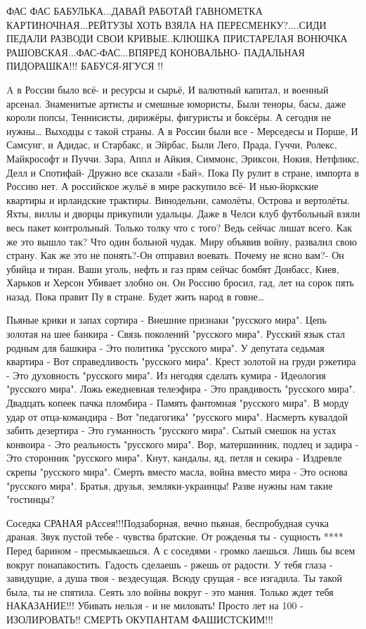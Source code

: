 ФАС ФАС БАБУЛЬКА...ДАВАЙ РАБОТАЙ ГАВНОМЕТКА КАРТИНОЧНАЯ...РЕЙТУЗЫ ХОТЬ ВЗЯЛА НА
ПЕРЕСМЕНКУ?....СИДИ ПЕДАЛИ РАЗВОДИ СВОИ КРИВЫЕ..КЛЮШКА ПРИСТАРЕЛАЯ ВОНЮЧКА
РАШОВСКАЯ...ФАС-ФАС...ВПЯРЕД КОНОВАЛЬНО- ПАДАЛЬНАЯ ПИДОРАШКА!!! БАБУСЯ-ЯГУСЯ !!      


A в России было всё- и ресурсы и сырьё,
И валютный капитал, и военный арсенал.
Знаменитые артисты и смешные юмористы,
Были теноры, басы, даже короли попсы,
Теннисисты, дирижёры, фигуристы и боксёры.
А сегодня не нужны… Выходцы с такой страны.
А в России были все - Мерседесы и Порше,
И Самсунг, и Адидас, и Старбакс, и Эйрбас,
Были Лего, Прада, Гуччи, Ролекс, Майкрософт и Пуччи.
Зара, Аппл и Айкия, Симмонс, Эриксон, Нокия,
Нетфликс, Делл и Спотифай-
Дружно все сказали «Бай».
Пока Пу рулит в стране, импорта в Россию нет.
А российское жульё в мире раскупило всё-
И нью-йоркские квартиры и ирландские трактиры.
Винодельни, самолёты,
Острова и вертолёты.
Яхты, виллы и дворцы прикупили удальцы.
Даже в Челси клуб футбольный
взяли весь пакет контрольный.
Только толку что с того?
Ведь сейчас лишат всего.
Как же это вышло так? Что один больной чудак.
Миру объявив войну, развалил свою страну.
Как же это не понять?-Он отправил воевать.
Почему не ясно вам?- Он убийца и тиран.
Ваши уголь, нефть и газ прям сейчас бомбят Донбасс,
Киев, Харьков и Херсон
Убивает злобно он.
Он Россию бросил, гад, лет на сорок пять назад.
Пока правит Пу в стране.
Будет жить народ в говне…

Пьяные крики и запах сортира -
Внешние признаки "русского мира".
Цепь золотая на шее банкира -
Связь поколений "русского мира".
Русский язык стал родным для башкира -
Это политика "русского мира".
У депутата седьмая квартира -
Вот справедливость "русского мира".
Крест золотой на груди рэкетира -
Это духовность "русского мира".
Из негодяя сделать кумира -
Идеология "русского мира".
Ложь ежедневная телеэфира -
Это правдивость "русского мира".
Двадцать копеек пачка пломбира -
Память фантомная "русского мира".
В морду удар от отца-командира -
Вот "педагогика" "русского мира".
Насмерть кувалдой забить дезертира -
Это гуманность "русского мира".
Сытый смешок на устах конвоира -
Это реальность "русского мира".
Вор, матершинник, подлец и задира -
Это сторонник "русского мира".
Кнут, кандалы, яд, петля и секира -
Издревле скрепы "русского мира".
Смерть вместо масла, война вместо мира -
Это основа "русского мира".
Братья, друзья, земляки-украинцы!
Разве нужны нам такие "гостинцы?

Соседка СРАНАЯ рАссея!!!Подзаборная, вечно пьяная, беспробудная сучка драная.
Звук пустой тебе - чувства братские. От рожденья ты - сущность **** Перед
барином - пресмыкаешься. А с соседями - громко лаешься. Лишь бы всем вокруг
понапакостить. Гадость сделаешь - ржешь от радости. У тебя глаза - завидущие, а
душа твоя - вездесущая. Всюду срущая - все изгадила. Ты такой была, ты не
спятила. Сеять зло войны вокруг - это мания. Только ждет тебя НАКАЗАНИЕ!!!
Убивать нельзя - и не миловать! Просто лет на 100 - ИЗОЛИРОВАТЬ!! СМЕРТЬ
ОКУПАНТАМ ФАШИСТСКИМ!!!

